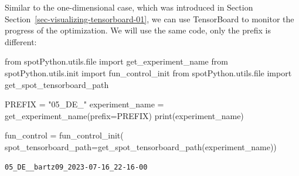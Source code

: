 \documentclass[
  letterpaper,
  DIV=11,
  numbers=noendperiod]{scrreprt}
\newenvironment{Shaded}{\begin{snugshade}}{\end{snugshade}}
\newcommand{\BuiltInTok}[1]{\textcolor[rgb]{0.00,0.23,0.31}{#1}}
\newcommand{\ImportTok}[1]{\textcolor[rgb]{0.00,0.46,0.62}{#1}}
\newcommand{\NormalTok}[1]{\textcolor[rgb]{0.00,0.23,0.31}{#1}}
\newcommand{\OperatorTok}[1]{\textcolor[rgb]{0.37,0.37,0.37}{#1}}
\newcommand{\StringTok}[1]{\textcolor[rgb]{0.13,0.47,0.30}{#1}}
\begin{document}
\begin{tcolorbox}[enhanced jigsaw, left=2mm, title=\textcolor{quarto-callout-note-color}{\faInfo}\hspace{0.5em}{TensorBoard}, titlerule=0mm, toprule=.15mm, leftrule=.75mm, colbacktitle=quarto-callout-note-color!10!white, colback=white, arc=.35mm, toptitle=1mm, bottomtitle=1mm, colframe=quarto-callout-note-color-frame, bottomrule=.15mm, rightrule=.15mm, breakable, coltitle=black, opacitybacktitle=0.6, opacityback=0]

Similar to the one-dimensional case, which was introduced in Section
Section~\ref{sec-visualizing-tensorboard-01}, we can use TensorBoard to
monitor the progress of the optimization. We will use the same code,
only the prefix is different:

\begin{Shaded}
\begin{Highlighting}[]
\ImportTok{from}\NormalTok{ spotPython.utils.}\BuiltInTok{file} \ImportTok{import}\NormalTok{ get\_experiment\_name}
\ImportTok{from}\NormalTok{ spotPython.utils.init }\ImportTok{import}\NormalTok{ fun\_control\_init}
\ImportTok{from}\NormalTok{ spotPython.utils.}\BuiltInTok{file} \ImportTok{import}\NormalTok{ get\_spot\_tensorboard\_path}

\NormalTok{PREFIX }\OperatorTok{=} \StringTok{"05\_DE\_"}
\NormalTok{experiment\_name }\OperatorTok{=}\NormalTok{ get\_experiment\_name(prefix}\OperatorTok{=}\NormalTok{PREFIX)}
\BuiltInTok{print}\NormalTok{(experiment\_name)}

\NormalTok{fun\_control }\OperatorTok{=}\NormalTok{ fun\_control\_init(}
\NormalTok{    spot\_tensorboard\_path}\OperatorTok{=}\NormalTok{get\_spot\_tensorboard\_path(experiment\_name))}
\end{Highlighting}
\end{Shaded}

\begin{verbatim}
05_DE__bartz09_2023-07-16_22-16-00
\end{verbatim}

\end{tcolorbox}
\end{document}
